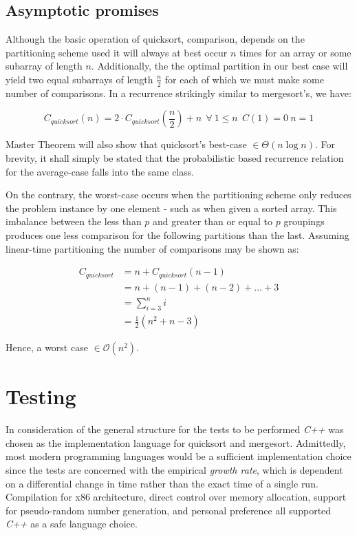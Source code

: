 \documentclass[11pt,letterpaper]{report}
\begin{document}
\subsection*{Asymptotic promises}
Although the basic operation of quicksort, comparison, depends on the partitioning scheme used it will always at best occur $n$ times for an array or some subarray of length $n$. Additionally, the the optimal partition in our best case will yield two equal subarrays of length $\frac{n}{2}$ for each of which we must make some number of comparisons. In a recurrence strikingly similar to mergesort's, we have:

\begin{equation} 
C_{quicksort}(n)=2 \cdot C_{quicksort}(\frac{n}{2})+n \ \ \forall \ 1 \leq n \ \ C(1) = 0 \ n=1
\end{equation}

Master Theorem will also show that quicksort's best-case $\in \Theta(n\log{}n)$. For brevity, it shall simply be stated that the probabilistic based recurrence relation for the average-case falls into the same class.

On the contrary, the worst-case occurs when the partitioning scheme only reduces the problem instance by one element - such as when given a sorted array. This imbalance between the less than $p$ and greater than or equal to $p$ groupings produces one less comparison for the following partitions than the last. Assuming linear-time partitioning the number of comparisons may be shown as:

\begin{equation} \label{eq1}
\begin{split}
C_{quicksort} & =n+C_{quicksort}(n-1) \\
		     & =n+(n-1)+(n-2)+...+3 \\
                      & = \sum_{i=3}^{n}i \\
                      & = \frac{1}{2}(n^2+n-3)
\end{split}
\end{equation}


Hence, a worst case $\in \mathcal{O}(n^2)$.

\section*{Testing}
In consideration of the general structure for the tests to be performed \emph{C++} was chosen as the implementation language for quicksort and mergesort. Admittedly, most modern programming languages would be a sufficient implementation choice since the tests are concerned with the empirical \emph{growth rate}, which is dependent on a differential change in time rather than the exact time of a single run. Compilation for x86 architecture, direct control over memory allocation, support for pseudo-random number generation, and personal preference all supported \emph{C++} as a safe language choice.
\end{document}
